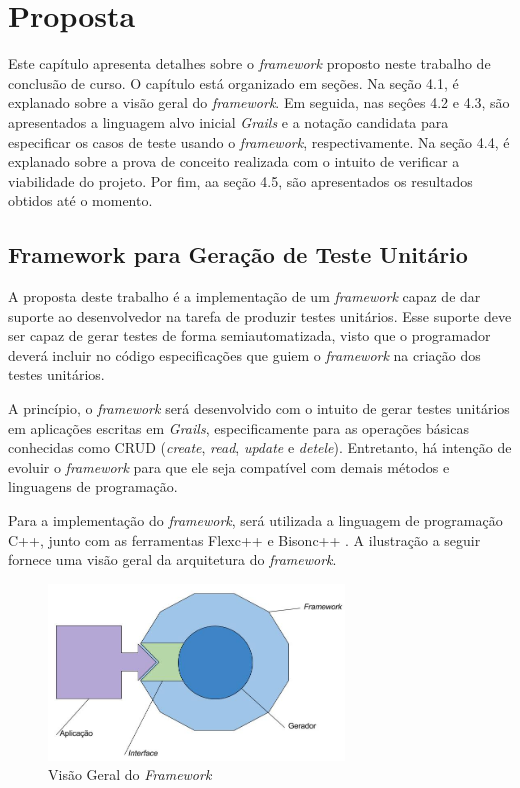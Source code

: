 \chapter[Proposta]{Proposta}
Este capítulo apresenta detalhes sobre o \textit{framework} proposto neste trabalho de conclusão de curso. O capítulo está organizado em seções. Na seção 4.1, é explanado sobre a visão geral do \textit{framework}. Em seguida, nas seçôes 4.2 e 4.3, são apresentados a linguagem alvo inicial \textit{Grails} e a notação candidata para especificar os casos de teste usando o \textit{framework}, respectivamente. Na seção 4.4, é explanado sobre a prova de conceito realizada com o intuito de verificar a viabilidade do projeto. Por fim, aa seção 4.5,  são apresentados os resultados obtidos até o momento.

\section{Framework para Geração de Teste Unitário} \label{ch4sec1}

A proposta deste trabalho é a implementação de um \textit{framework} capaz de dar suporte ao desenvolvedor na tarefa de produzir testes unitários.  Esse suporte deve ser capaz de gerar testes de forma semiautomatizada, visto que o programador deverá incluir no código especificações que guiem o \textit{framework} na criação dos testes unitários. 
\par
\indent A princípio, o \textit{framework} será desenvolvido com o intuito de gerar testes unitários em aplicações escritas em \textit{Grails}, especificamente para as operações básicas conhecidas como CRUD (\textit{create}, \textit{read}, \textit{update} e \textit{detele}). Entretanto, há intenção de evoluir o \textit{framework} para que ele seja compatível com demais métodos e linguagens de programação. 
\par
\indent Para a implementação do \textit{framework}, será utilizada a linguagem de programação C++, junto com as ferramentas Flexc++ \cite{flexcpp2015} e Bisonc++ \cite{bisoncpp2015}. A ilustração a seguir fornece uma visão geral da arquitetura do \textit{framework}.
 
 \begin{figure}[h]
    \centering
    \includegraphics[width=0.7\textwidth]{figuras/estruturaarquitetural.jpg}
    \caption{Visão Geral do \textit{Framework}}
    \label{fig:estruturaarquitetural}
 \end{figure}

